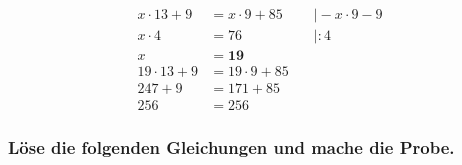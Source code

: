 \documentclass[a4paper,10pt]{article} %
\begin{document}
  \[
    \begin{aligned}
      x \cdot 13 + 9 &= x \cdot 9 + 85 &\quad\big| - x \cdot 9 - 9 \\
      x \cdot 4 &= 76 &\quad\big| : 4 \\
      x &= \mathbf{19} \\
      19 \cdot 13 + 9 &= 19 \cdot 9 + 85 \\
      247 + 9 &= 171 + 85 \\
      256 &= 256
    \end{aligned}
  \]

\subsubsection{Löse die folgenden Gleichungen und mache die Probe.} %
\end{document}
